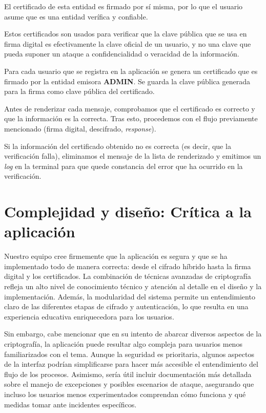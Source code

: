 \documentclass[a4paper,11pt]{article}
\begin{document}
El certificado de esta entidad es firmado por sí misma, por lo que el usuario asume que es una entidad verífica y confiable.

Estos certificados son usados para verificar que la clave pública que se usa en firma digital es efectivamente la clave oficial de un usuario, y no una clave que pueda suponer un ataque a confidencialidad o veracidad de la información.

Para cada usuario que se registra en la aplicación se genera un certificado que es firmado por la entidad emisora \textbf{ADMIN}. Se guarda la clave pública generada para la firma como clave pública del certificado.

Antes de renderizar cada mensaje, comprobamos que el certificado es correcto y que la información es la correcta. Tras esto, procedemos con el flujo previamente mencionado (firma digital, descifrado, \textit{response}). 

Si la información del certificado obtenido no es correcta (es decir, que la verificación falla), eliminamos el mensaje de la lista de renderizado y emitimos un \textit{log} en la terminal para que quede constancia del error que ha ocurrido en la verificación.
\section{Complejidad y diseño: Crítica a la aplicación}

Nuestro equipo cree firmemente que la aplicación es segura y que se ha implementado todo de manera correcta: desde el cifrado híbrido hasta la firma digital y los certificados. La combinación de técnicas avanzadas de criptografía refleja un alto nivel de conocimiento técnico y atención al detalle en el diseño y la implementación. Además, la modularidad del sistema permite un entendimiento claro de las diferentes etapas de cifrado y autenticación, lo que resulta en una experiencia educativa enriquecedora para los usuarios.  

Sin embargo, cabe mencionar que en su intento de abarcar diversos aspectos de la criptografía, la aplicación puede resultar algo compleja para usuarios menos familiarizados con el tema. Aunque la seguridad es prioritaria, algunos aspectos de la interfaz podrían simplificarse para hacer más accesible el entendimiento del flujo de los procesos. Asimismo, sería útil incluir documentación más detallada sobre el manejo de excepciones y posibles escenarios de ataque, asegurando que incluso los usuarios menos experimentados comprendan cómo funciona y qué medidas tomar ante incidentes específicos.  
\end{document}
